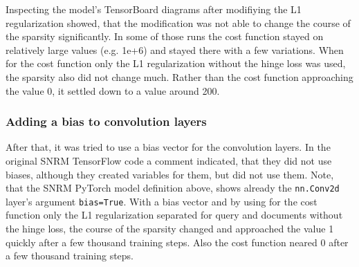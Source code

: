 Inspecting the model's TensorBoard diagrams after modifiying the L1 regularization showed,
    that the modification was not able to change the course of the sparsity significantly.
In some of those runs the cost function stayed on relatively large values (e.g. 1e+6)
    and stayed there with a few variations.
When for the cost function only the L1 regularization without the hinge loss was used,
    the sparsity also did not change much.
Rather than the cost function approaching the value 0, it settled down to a value
    around 200.

\subsubsection*{Adding a bias to convolution layers}
After that, it was tried to use a bias vector for the convolution layers.
In the original SNRM TensorFlow code a comment indicated, that they did not use biases,
    although they created variables for them, but did not use them.
Note, that the SNRM PyTorch model definition above, shows already the \texttt{nn.Conv2d} 
    layer's argument \texttt{bias=True}.
With a bias vector and by using for the cost function only the L1 regularization separated 
    for query and documents without the hinge loss,
    the course of the sparsity changed and approached the value 1 quickly after a few thousand 
    training steps.
Also the cost function neared 0 after a few thousand training steps.

